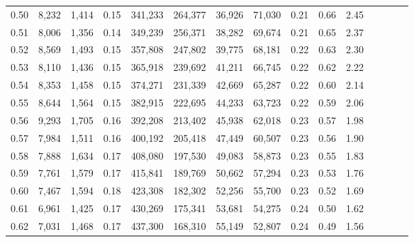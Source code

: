 \begin{tabular}{rrrcrrrrrrrrrrr}
0.50 &   8,232 &  1,414 &                                       0.15 &  341,233 &  264,377 &   36,926 &   71,030 &  0.21 &  0.66 &                         2.45 \\
0.51 &   8,006 &  1,356 &                                       0.14 &  349,239 &  256,371 &   38,282 &   69,674 &  0.21 &  0.65 &                         2.37 \\
0.52 &   8,569 &  1,493 &                                       0.15 &  357,808 &  247,802 &   39,775 &   68,181 &  0.22 &  0.63 &                         2.30 \\
0.53 &   8,110 &  1,436 &                                       0.15 &  365,918 &  239,692 &   41,211 &   66,745 &  0.22 &  0.62 &                         2.22 \\
0.54 &   8,353 &  1,458 &                                       0.15 &  374,271 &  231,339 &   42,669 &   65,287 &  0.22 &  0.60 &                         2.14 \\
0.55 &   8,644 &  1,564 &                                       0.15 &  382,915 &  222,695 &   44,233 &   63,723 &  0.22 &  0.59 &                         2.06 \\
0.56 &   9,293 &  1,705 &                                       0.16 &  392,208 &  213,402 &   45,938 &   62,018 &  0.23 &  0.57 &                         1.98 \\
0.57 &   7,984 &  1,511 &                                       0.16 &  400,192 &  205,418 &   47,449 &   60,507 &  0.23 &  0.56 &                         1.90 \\
0.58 &   7,888 &  1,634 &                                       0.17 &  408,080 &  197,530 &   49,083 &   58,873 &  0.23 &  0.55 &                         1.83 \\
0.59 &   7,761 &  1,579 &                                       0.17 &  415,841 &  189,769 &   50,662 &   57,294 &  0.23 &  0.53 &                         1.76 \\
0.60 &   7,467 &  1,594 &                                       0.18 &  423,308 &  182,302 &   52,256 &   55,700 &  0.23 &  0.52 &                         1.69 \\
0.61 &   6,961 &  1,425 &                                       0.17 &  430,269 &  175,341 &   53,681 &   54,275 &  0.24 &  0.50 &                         1.62 \\
0.62 &   7,031 &  1,468 &                                       0.17 &  437,300 &  168,310 &   55,149 &   52,807 &  0.24 &  0.49 &                         1.56 \\

\end{tabular}
